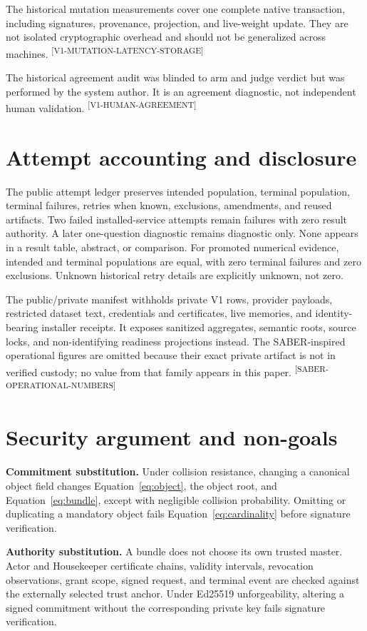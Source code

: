 \documentclass[10pt]{article}
\newcommand{\evidence}[1]{\textsuperscript{\scriptsize\textsf{[#1]}}}
\begin{document}
The historical mutation measurements cover one complete native transaction,
including signatures, provenance, projection, and live-weight update. They are
not isolated cryptographic overhead and should not be generalized across
machines. \evidence{V1-MUTATION-LATENCY-STORAGE}

The historical agreement audit was blinded to arm and judge verdict but was
performed by the system author. It is an agreement diagnostic, not independent
human validation. \evidence{V1-HUMAN-AGREEMENT}

\section{Attempt accounting and disclosure}

The public attempt ledger preserves intended population, terminal population,
terminal failures, retries when known, exclusions, amendments, and reused
artifacts. Two failed installed-service attempts remain failures with zero result
authority. A later one-question diagnostic remains diagnostic only. None appears
in a result table, abstract, or comparison. For promoted numerical evidence,
intended and terminal populations are equal, with zero terminal failures and
zero exclusions. Unknown historical retry details are explicitly unknown, not
zero.

The public/private manifest withholds private V1 rows, provider payloads,
restricted dataset text, credentials and certificates, live memories, and
identity-bearing installer receipts. It exposes sanitized aggregates, semantic
roots, source locks, and non-identifying readiness projections instead. The
SABER-inspired operational figures are omitted because their exact private
artifact is not in verified custody; no value from that family appears in this
paper. \evidence{SABER-OPERATIONAL-NUMBERS}

\section{Security argument and non-goals}

\textbf{Commitment substitution.} Under collision resistance, changing a
canonical object field changes Equation~\ref{eq:object}, the object root, and
Equation~\ref{eq:bundle}, except with negligible collision probability.
Omitting or duplicating a mandatory object fails Equation~\ref{eq:cardinality}
before signature verification.

\textbf{Authority substitution.} A bundle does not choose its own trusted
master. Actor and Housekeeper certificate chains, validity intervals,
revocation observations, grant scope, signed request, and terminal event are
checked against the externally selected trust anchor. Under Ed25519
unforgeability, altering a signed commitment without the corresponding private
key fails signature verification.
\end{document}
